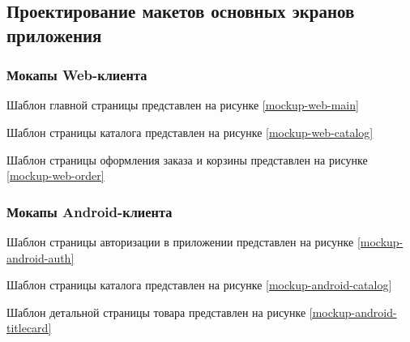 \subsection{Проектирование макетов основных экранов приложения}\label{subsec:2-design-mockups}\indent

\subsubsection{Мокапы Web-клиента}\indent

Шаблон главной страницы представлен на рисунке \ref{mockup-web-main}

Шаблон страницы каталога представлен на рисунке \ref{mockup-web-catalog}

Шаблон страницы оформления заказа и корзины представлен на рисунке \ref{mockup-web-order}

\subsubsection{Мокапы Android-клиента}

Шаблон страницы авторизации в приложении представлен на рисунке \ref{mockup-android-auth}

Шаблон страницы каталога представлен на рисунке \ref{mockup-android-catalog}

Шаблон детальной страницы товара представлен на рисунке \ref{mockup-android-titlecard}

